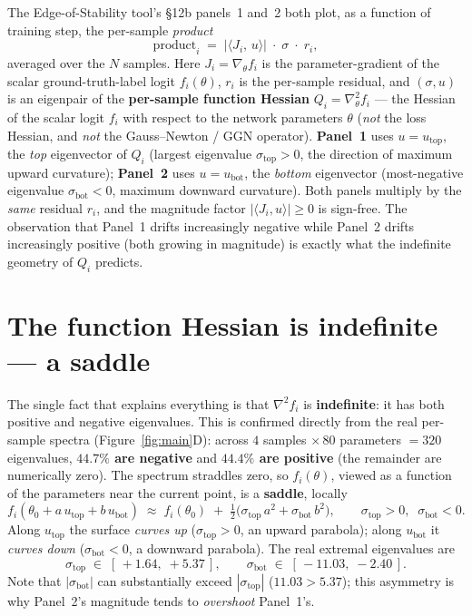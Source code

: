 \documentclass[11pt]{article}
\newcommand{\utop}{u_{\mathrm{top}}}
\newcommand{\ubot}{u_{\mathrm{bot}}}
\newcommand{\sgtop}{\sigma_{\mathrm{top}}}
\newcommand{\sgbot}{\sigma_{\mathrm{bot}}}
\begin{document}
The Edge-of-Stability tool's \S12b panels~1 and~2 both plot, as a function of training step,
the per-sample \emph{product}
\begin{equation}
  \mathrm{product}_i \;=\; \bigl|\langle J_i,\, u\rangle\bigr| \;\cdot\; \sigma \;\cdot\; r_i ,
  \label{eq:product}
\end{equation}
averaged over the $N$ samples. Here $J_i = \nabla_\theta f_i$ is the parameter-gradient of the
scalar ground-truth-label logit $f_i(\theta)$, $r_i$ is the per-sample residual, and $(\sigma, u)$
is an eigenpair of the \textbf{per-sample function Hessian} $Q_i = \nabla^2_\theta f_i$ ---
the Hessian of the scalar logit $f_i$ with respect to the network parameters $\theta$
(\emph{not} the loss Hessian, and \emph{not} the Gauss--Newton / GGN operator).
\textbf{Panel~1} uses $u=\utop$, the \emph{top} eigenvector of $Q_i$ (largest eigenvalue
$\sgtop>0$, the direction of maximum upward curvature); \textbf{Panel~2} uses $u=\ubot$, the
\emph{bottom} eigenvector (most-negative eigenvalue $\sgbot<0$, maximum downward curvature).
Both panels multiply by the \emph{same} residual $r_i$, and the magnitude factor
$|\langle J_i,u\rangle|\ge 0$ is sign-free. The observation that Panel~1 drifts increasingly
negative while Panel~2 drifts increasingly positive (both growing in magnitude) is exactly what the
indefinite geometry of $Q_i$ predicts.

\section{The function Hessian is indefinite --- a saddle}

The single fact that explains everything is that $\nabla^2 f_i$ is \textbf{indefinite}: it has both
positive and negative eigenvalues. This is confirmed directly from the real per-sample spectra
(Figure~\ref{fig:main}D): across $4$ samples $\times\, 80$ parameters $=320$ eigenvalues,
\textbf{$44.7\%$ are negative} and \textbf{$44.4\%$ are positive} (the remainder are numerically
zero). The spectrum straddles zero, so $f_i(\theta)$, viewed as a function of the parameters near
the current point, is a \textbf{saddle}, locally
\begin{equation}
  f_i(\theta_0 + a\,\utop + b\,\ubot) \;\approx\;
  f_i(\theta_0) \;+\; \tfrac{1}{2}\bigl(\sgtop\,a^2 + \sgbot\,b^2\bigr),
  \qquad \sgtop>0,\;\; \sgbot<0 .
  \label{eq:saddle}
\end{equation}
Along $\utop$ the surface \emph{curves up} ($\sgtop>0$, an upward parabola); along $\ubot$ it
\emph{curves down} ($\sgbot<0$, a downward parabola). The real extremal eigenvalues are
\begin{equation}
  \sgtop \;\in\; [\,+1.64,\; +5.37\,], \qquad
  \sgbot \;\in\; [\,-11.03,\; -2.40\,].
\end{equation}
Note that $|\sgbot|$ can substantially exceed $|\sgtop|$
($11.03 > 5.37$); this asymmetry is why Panel~2's magnitude tends to \emph{overshoot} Panel~1's.
\end{document}
